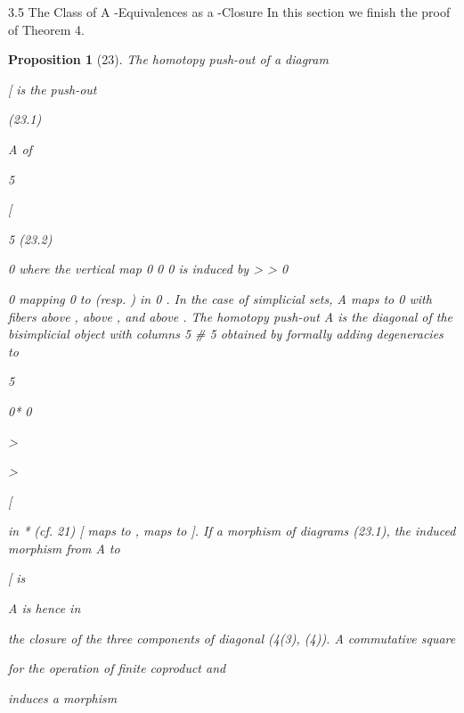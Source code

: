 \documentclass[11pt,a4paper]{article}
\theoremstyle{plain}
\newtheorem{proposition}[theorem]{Proposition}
\theoremstyle{definition}
\begin{document}
3.5 The Class of A -Equivalences as a -Closure
In this section we finish the proof of Theorem 4.
\begin{proposition}[23]
The homotopy push-out of a diagram

 


[
is the push-out

(23.1)

A of

5




[



5
(23.2)

0
where the vertical map
0 0 
0 is induced by >  > 0


0 mapping 0 to  (resp. ) in 0 . In the case of simplicial sets,  A maps to
0    with fibers   above ,   above , and   above  .
The homotopy push-out A is the diagonal of the bisimplicial object with
columns
5 \# 5 obtained by formally adding degeneracies to

5

0* 0  

>

>

 [

in   *
 (cf. 21) [ maps to ,  maps to ]. If
a morphism of diagrams (23.1), the induced morphism from A to

[ is

A is hence in



the closure of the three components of
diagonal (4(3), (4)).
A commutative square

 for the operation of finite coproduct and

  



induces a morphism
\end{proposition}
\end{document}
